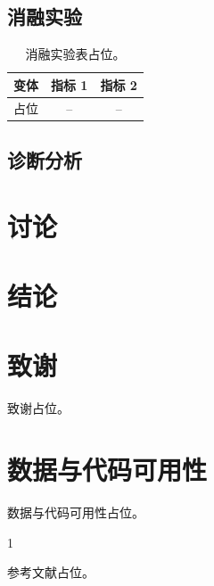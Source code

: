 \documentclass[journal]{IEEEtran}
\begin{document}
\subsection{消融实验}

\begin{table}[!t]
    \centering
    \caption{消融实验表占位。}
    \label{tab:ablation}
    \begin{tabular}{lcc}
        \toprule
        变体 & 指标 1 & 指标 2 \\
        \midrule
        占位 & -- & -- \\
        \bottomrule
    \end{tabular}
\end{table}

\subsection{诊断分析}

\section{讨论}

\section{结论}

\section*{致谢}
致谢占位。

\section*{数据与代码可用性}
数据与代码可用性占位。

\begin{thebibliography}{1}

参考文献占位。

\end{thebibliography}
\end{document}
